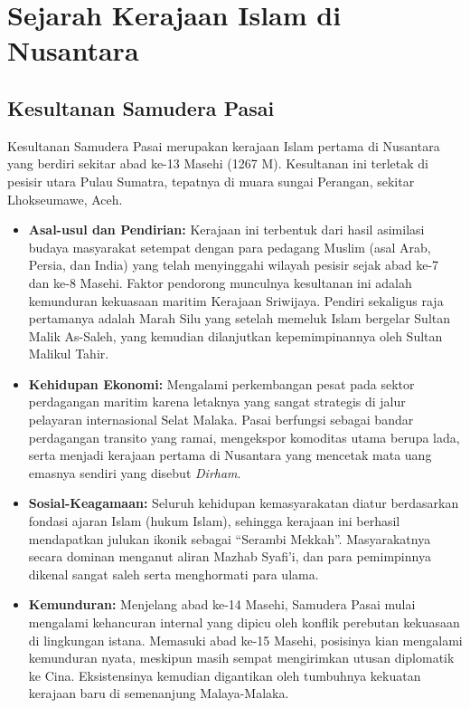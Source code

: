 \documentclass[12pt, a4paper]{article}
\begin{document}
\section{Sejarah Kerajaan Islam di Nusantara}

\subsection{Kesultanan Samudera Pasai}
Kesultanan Samudera Pasai merupakan kerajaan Islam pertama di Nusantara yang berdiri sekitar abad ke-13 Masehi (1267 M). Kesultanan ini terletak di pesisir utara Pulau Sumatra, tepatnya di muara sungai Perangan, sekitar Lhokseumawe, Aceh.
\begin{itemize}
	\item \textbf{Asal-usul dan Pendirian:} Kerajaan ini terbentuk dari hasil asimilasi budaya masyarakat setempat dengan para pedagang Muslim (asal Arab, Persia, dan India) yang telah menyinggahi wilayah pesisir sejak abad ke-7 dan ke-8 Masehi. Faktor pendorong munculnya kesultanan ini adalah kemunduran kekuasaan maritim Kerajaan Sriwijaya. Pendiri sekaligus raja pertamanya adalah Marah Silu yang setelah memeluk Islam bergelar Sultan Malik As-Saleh, yang kemudian dilanjutkan kepemimpinannya oleh Sultan Malikul Tahir.
	\item \textbf{Kehidupan Ekonomi:} Mengalami perkembangan pesat pada sektor perdagangan maritim karena letaknya yang sangat strategis di jalur pelayaran internasional Selat Malaka. Pasai berfungsi sebagai bandar perdagangan transito yang ramai, mengekspor komoditas utama berupa lada, serta menjadi kerajaan pertama di Nusantara yang mencetak mata uang emasnya sendiri yang disebut \textit{Dirham}.
	\item \textbf{Sosial-Keagamaan:} Seluruh kehidupan kemasyarakatan diatur berdasarkan fondasi ajaran Islam (hukum Islam), sehingga kerajaan ini berhasil mendapatkan julukan ikonik sebagai ``Serambi Mekkah''. Masyarakatnya secara dominan menganut aliran Mazhab Syafi'i, dan para pemimpinnya dikenal sangat saleh serta menghormati para ulama.
	\item \textbf{Kemunduran:} Menjelang abad ke-14 Masehi, Samudera Pasai mulai mengalami kehancuran internal yang dipicu oleh konflik perebutan kekuasaan di lingkungan istana. Memasuki abad ke-15 Masehi, posisinya kian mengalami kemunduran nyata, meskipun masih sempat mengirimkan utusan diplomatik ke Cina. Eksistensinya kemudian digantikan oleh tumbuhnya kekuatan kerajaan baru di semenanjung Malaya-Malaka.
\end{itemize}
\end{document}
